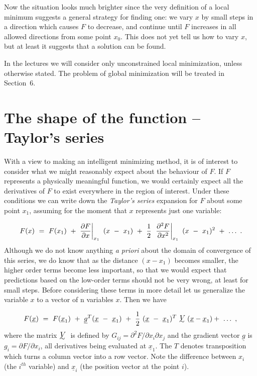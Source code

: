      Now the situation looks much brighter since the very definition of
a local minimum suggests a general strategy for finding one:  we vary $x$
by small steps in a direction which causes $F$ to decrease, and continue
until $F$ increases in all allowed directions from some point $x_0$.
This
does not yet tell us how to vary $x$, but at least it suggests that a solution
can be found.
 
In the lectures we will consider only unconstrained local minimization, unless otherwise stated.
The problem of global minimization will be treated in Section~6.
 
 
\section{The shape of the function -- Taylor's series}
 
     With a view to making an intelligent minimizing method, it is of
interest to consider what we might reasonably expect about the behaviour
of $F$.
If $F$ represents a physically meaningful function, we would certainly
expect all the derivatives of $F$ to exist everywhere in the region of
interest.  Under these conditions we can write down the {\em Taylor's series}
expansion for $F$ about some point $x_1$, assuming for the moment that $x$
represents just one variable:
 
$$\left .F(x)~=~F(x_1)~+~{\partial F\over \partial x}\right
|_{x_{1}}~(x~-~x_{1})~+~{1\over 2}~\left .{\partial^{2}F\over \partial x^2}\right
|_{x_{1}}~(x~-~x_{1})^{2}~+~\ldots~.$$
 Although we do not know anything {\em a priori} about the domain of convergence
of this series, we do know that as the distance $(x - x_1)$ becomes smaller,
the higher order terms become less important, so that we would expect
that predictions based on the low-order terms should not be very wrong,
at least for small steps.  Before considering these terms in more detail
let us generalize the variable $x$ to a vector of n variables $x$.  Then we
have
 
$$F({\underline{x}})~=~F({\underline{x}}_1)~+~{\underline{g}}^T({\underline{x}}
~-~{\underline{x}}_1)~+~{1\over 2}~({\underline{x}}~-~{\underline{x}}_1)^T~\UTV({\underline{x}}
 - {\underline{x}}_1)
+~\ldots~,$$
where the matrix $\UTV$ is defined by $G_{ij} = \partial^2 F/\partial x_i
\partial x_{j}$ and
          the gradient vector ${\underline{g}}$ is $g_i = \partial F/\partial x_i$, all
derivatives
          being evaluated at ${\underline{x}}_1$.  The $T$ denotes transposition
          which turns a column vector into a row vector.  Note
          the difference between $x_i$ (the $i^{th}$ variable) and ${\underline{x}}_i$
          (the position vector at the point $i$).
 
